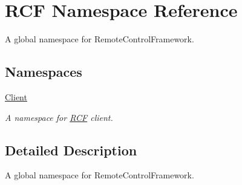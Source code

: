 \hypertarget{namespace_r_c_f}{}\section{R\+C\+F Namespace Reference}
\label{namespace_r_c_f}


A global namespace for Remote\+Control\+Framework.  


\subsection*{Namespaces}
\begin{DoxyCompactItemize}
\item 
 \hyperlink{namespace_r_c_f_1_1_client}{Client}
\begin{DoxyCompactList}\small\item\em A namespace for \hyperlink{namespace_r_c_f}{R\+C\+F} client. \end{DoxyCompactList}\end{DoxyCompactItemize}


\subsection{Detailed Description}
A global namespace for Remote\+Control\+Framework. 